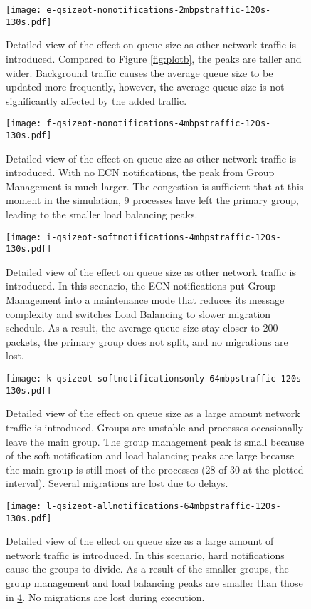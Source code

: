 \begin{figure}
\texttt{[image: e-qsizeot-nonotifications-2mbpstraffic-120s-130s.pdf]}
\caption{Detailed view of the effect on queue size as other network traffic is introduced. Compared to Figure \ref{fig:plotb}, the peaks are taller and wider. Background traffic causes the average queue size to be updated more frequently, however, the average queue size is not significantly affected by the added traffic.}
\label{fig:plote}
\end{figure}

\begin{figure}
\texttt{[image: f-qsizeot-nonotifications-4mbpstraffic-120s-130s.pdf]}
\caption{Detailed view of the effect on queue size as other network traffic is introduced. With no \ac{ECN} notifications, the peak from Group Management is much larger. The congestion is sufficient that at this moment in the simulation, 9 processes have left the primary group, leading to the smaller load balancing peaks.}
\label{fig:plotf}
\end{figure}

\begin{figure}
\texttt{[image: i-qsizeot-softnotifications-4mbpstraffic-120s-130s.pdf]}
\caption{Detailed view of the effect on queue size as other network traffic is introduced. In this scenario, the ECN notifications put Group Management into a maintenance mode that reduces its message complexity and switches Load Balancing to slower migration schedule. As a result, the average queue size stay closer to 200 packets, the primary group does not split, and no migrations are lost.}
\label{fig:ploti}
\end{figure}

\begin{figure}
\texttt{[image: k-qsizeot-softnotificationsonly-64mbpstraffic-120s-130s.pdf]}
\caption{Detailed view of the effect on queue size as a large amount network traffic is introduced. Groups are unstable and processes occasionally leave the main group. The group management peak is small because of the soft notification and load balancing peaks are large because the main group is still most of the processes (28 of 30 at the plotted interval). Several migrations are lost due to delays.}
\label{fig:plotk}
\end{figure}

\begin{figure}
\texttt{[image: l-qsizeot-allnotifications-64mbpstraffic-120s-130s.pdf]}
\caption{Detailed view of the effect on queue size as a large amount of network traffic is introduced. In this scenario, hard notifications cause the groups to divide. As a result of the smaller groups, the group management and load balancing peaks are smaller than those in \ref{fig:plotk}. No migrations are lost during execution.}
\label{fig:plotl}
\end{figure}


